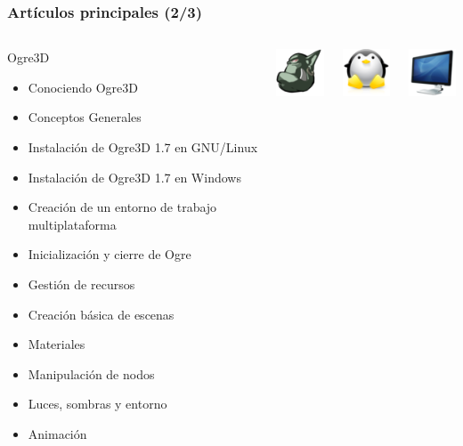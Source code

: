 \documentclass[green]{beamer}
\begin{document}
\begin{frame}
\transdissolve
    \frametitle{Artículos principales (2/3)}
        
    \begin{columns}[c]
    \column{230pt}
        
	\scriptsize{
	\begin{block}{Ogre3D}
            \begin{itemize}
                \item Conociendo Ogre3D
		\item Conceptos Generales
		\item Instalación de Ogre3D 1.7 en GNU/Linux
		\item Instalación de Ogre3D 1.7 en Windows
		\item Creación de un entorno de trabajo multiplataforma
		\item Inicialización y cierre de Ogre
		\item Gestión de recursos
		\item Creación básica de escenas
		\item Materiales
		\item Manipulación de nodos
		\item Luces, sombras y entorno
		\item Animación
            \end{itemize}            
        \end{block}
	}

    \column{40pt}
        
	\begin{center}
	    \includegraphics[scale=0.28]{img/ogre.png}
	\end{center}
	
	\begin{center}
	    \includegraphics[scale=0.28]{img/tux.png}
	\end{center}
	
	\begin{center}
	    \includegraphics[scale=0.28]{img/trabajo.png}
	\end{center}
	

\end{columns}
\end{frame}
\end{document}
